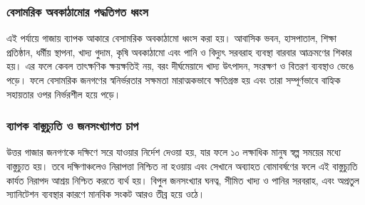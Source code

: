 \subsubsection{\texorpdfstring{বেসামরিক অবকাঠামোর পদ্ধতিগত
ধ্বংস}{বেসামরিক অবকাঠামোর পদ্ধতিগত ধ্বংস}}\label{ux9acux9b8ux9aeux9b0ux995-ux985ux9acux995ux9a0ux9aeux9b0-ux9aaux9a6ux9a7ux9a4ux997ux9a4-ux9a7ux9acux9b8}

এই পর্যায়ে গাজায় ব্যাপক আকারে বেসামরিক অবকাঠামো ধ্বংস করা হয়। আবাসিক ভবন,
হাসপাতাল, শিক্ষা প্রতিষ্ঠান, ধর্মীয় স্থাপনা, খাদ্য গুদাম, কৃষি অবকাঠামো এবং পানি
ও বিদ্যুৎ সরবরাহ ব্যবস্থা বারবার আক্রমণের শিকার হয়। এর ফলে কেবল তাৎক্ষণিক
ক্ষয়ক্ষতিই নয়, বরং দীর্ঘমেয়াদে খাদ্য উৎপাদন, সংরক্ষণ ও বিতরণ ব্যবস্থাও ভেঙে
পড়ে। ফলে বেসামরিক জনগণের স্বনির্ভরতার সক্ষমতা মারাত্মকভাবে ক্ষতিগ্রস্ত হয় এবং
তারা সম্পূর্ণভাবে বাহ্যিক সহায়তার ওপর নির্ভরশীল হয়ে পড়ে।
\vspace{0.3em}

\subsubsection{ব্যাপক বাস্তুচ্যুতি ও জনসংখ্যাগত
চাপ}\label{ux9acux9afux9aaux995-ux9acux9b8ux9a4ux99aux9afux9a4-ux993-ux99cux9a8ux9b8ux996ux9afux997ux9a4-ux99aux9aa}

উত্তর গাজার জনগণকে দক্ষিণে সরে যাওয়ার নির্দেশ দেওয়া হয়, যার ফলে ১০ লক্ষাধিক
মানুষ স্বল্প সময়ের মধ্যে বাস্তুচ্যুত হয়। তবে দক্ষিণাঞ্চলেও নিরাপত্তা নিশ্চিত না
হওয়ায় এবং সেখানে অব্যাহত বোমাবর্ষণের ফলে এই বাস্তুচ্যুতি কার্যত নিরাপদ আশ্রয়
নিশ্চিত করতে ব্যর্থ হয়। বিপুল জনসংখ্যার ঘনত্ব, সীমিত খাদ্য ও পানির সরবরাহ, এবং
অপ্রতুল স্যানিটেশন ব্যবস্থার কারণে মানবিক সংকট আরও তীব্র হয়ে ওঠে।
\vspace{0.3em}

